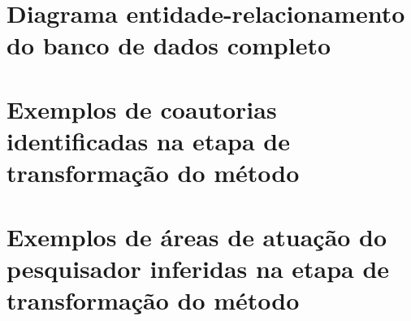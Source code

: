 
\begin{apendicesenv}

\partapendices

\chapter{Diagrama entidade-relacionamento do banco de dados completo}

\chapter{Exemplos de coautorias identificadas na etapa de transformação do método}

\chapter{Exemplos de áreas de atuação do pesquisador inferidas na etapa de transformação do método}

\end{apendicesenv}
